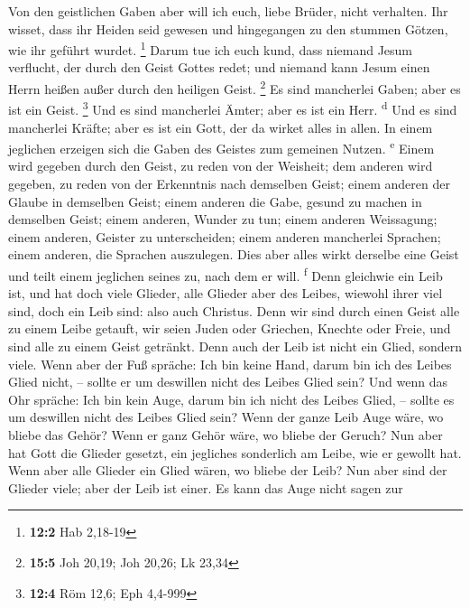  Von den geistlichen Gaben aber will ich euch, liebe
Brüder, nicht verhalten.  Ihr wisset, dass ihr Heiden seid
gewesen und hingegangen zu den stummen Götzen, wie ihr geführt wurdet.
\footnote{\textbf{12:2} Hab 2,18-19}  Darum tue ich euch
kund, dass niemand Jesum verflucht, der durch den Geist Gottes redet;
und niemand kann Jesum einen Herrn heißen außer durch den heiligen
Geist. \footnote{\textbf{15:5} Joh 20,19; Joh 20,26; Lk 23,34}
 Es sind mancherlei Gaben; aber es ist ein Geist.
\footnote{\textbf{12:4} Röm 12,6; Eph 4,4-999}  Und es
sind mancherlei Ämter; aber es ist ein Herr. \textsuperscript{d}
 Und es sind mancherlei Kräfte; aber es ist ein Gott, der
da wirket alles in allen.  In einem jeglichen erzeigen
sich die Gaben des Geistes zum gemeinen Nutzen. \textsuperscript{e}
 Einem wird gegeben durch den Geist, zu reden von der
Weisheit; dem anderen wird gegeben, zu reden von der Erkenntnis nach
demselben Geist;  einem anderen der Glaube in demselben
Geist; einem anderen die Gabe, gesund zu machen in demselben Geist;
 einem anderen, Wunder zu tun; einem anderen Weissagung;
einem anderen, Geister zu unterscheiden; einem anderen mancherlei
Sprachen; einem anderen, die Sprachen auszulegen.  Dies
aber alles wirkt derselbe eine Geist und teilt einem jeglichen seines
zu, nach dem er will. \textsuperscript{f}  Denn gleichwie
ein Leib ist, und hat doch viele Glieder, alle Glieder aber des Leibes,
wiewohl ihrer viel sind, doch ein Leib sind: also auch Christus.
 Denn wir sind durch einen Geist alle zu einem Leibe
getauft, wir seien Juden oder Griechen, Knechte oder Freie, und sind
alle zu einem Geist getränkt.  Denn auch der Leib ist
nicht ein Glied, sondern viele.  Wenn aber der Fuß
spräche: Ich bin keine Hand, darum bin ich des Leibes Glied nicht, --
sollte er um deswillen nicht des Leibes Glied sein?  Und
wenn das Ohr spräche: Ich bin kein Auge, darum bin ich nicht des Leibes
Glied, -- sollte es um deswillen nicht des Leibes Glied sein?
 Wenn der ganze Leib Auge wäre, wo bliebe das Gehör? Wenn
er ganz Gehör wäre, wo bliebe der Geruch?  Nun aber hat
Gott die Glieder gesetzt, ein jegliches sonderlich am Leibe, wie er
gewollt hat.  Wenn aber alle Glieder ein Glied wären, wo
bliebe der Leib?  Nun aber sind der Glieder viele; aber
der Leib ist einer.  Es kann das Auge nicht sagen zur
